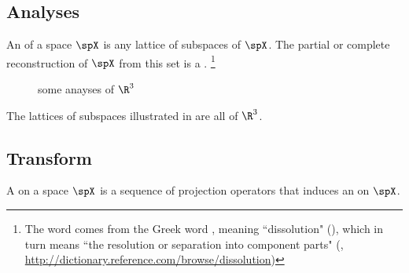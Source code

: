 \subsection{Analyses}
An  of a space $\spX$ is any lattice of subspaces of $\spX$.
        The partial or complete reconstruction of $\spX$ from this set is a .%
\footnote{%
  The word  comes from the Greek word
  {},
  meaning ``dissolution" (),
  which in turn means
  ``the resolution or separation into component parts"
  (, \scs\url{http://dictionary.reference.com/browse/dissolution})
  }

\begin{figure}[th]
  \caption{some anayses of $\R^3$  \label{fig:r3analyses}}
\end{figure}%
\begin{example}
\label{ex:r3analyses}
  The lattices of subspaces illustrated in  are all  of
  $\R^3$.
\end{example}



\subsection{Transform}
\begin{definition}
A  on a space $\spX$ is a sequence of projection operators that induces
an  on $\spX$.
\end{definition}

